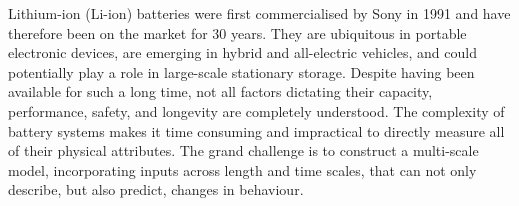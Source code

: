 \documentclass[../main.tex]{subfiles}
\begin{document}










Lithium-ion (Li-ion) batteries were first commercialised by Sony in 1991 and have therefore been on the market for 30 years. \cite{zeng2019commercialization} They are ubiquitous in portable electronic devices, are emerging in hybrid and all-electric vehicles, \cite{Goodenough2010} and could potentially play a role in large-scale stationary storage. \cite{kubiak2017calendar} Despite having been available for such a long time, not all factors dictating their capacity, performance, safety, and longevity are completely understood. The complexity of battery systems makes it time consuming and impractical to directly measure all of their physical attributes. The grand challenge is to construct a multi-scale model, incorporating inputs across length and time scales, that can not only describe, but also predict, changes in behaviour.
\end{document}
